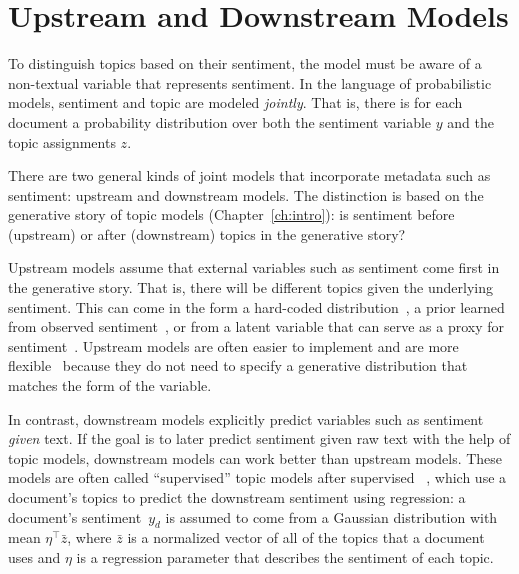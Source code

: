 
\section{Upstream and Downstream Models}

To distinguish topics based on their sentiment, the model must be
aware of a non-textual variable that represents sentiment.
In the language of probabilistic models,
sentiment and topic are modeled \emph{jointly}.  That is, there is for each document a
probability distribution over both the sentiment variable $y$ and
the topic assignments $z$.

There are two general kinds of joint models that incorporate metadata
such as sentiment: upstream and downstream models.  The distinction is
based on the generative story of topic models (Chapter~\ref{ch:intro}): is
sentiment before (upstream) or after (downstream) topics in the
generative story?


Upstream models assume that external variables such as sentiment come first in the generative
story.  That is, there will be different topics given the underlying
sentiment.  This can come in the form a hard-coded distribution~\citep{mei-07b}, a prior learned from observed
sentiment~\citep{mimno-08}, or from a latent variable that can serve as
a proxy for sentiment~\citep{lin-09}.  Upstream models are often
easier to implement and are more flexible~\citep{stewart-14} because they do not need to specify a generative distribution that matches the form of the variable.

In contrast, downstream models explicitly predict variables such as sentiment
\emph{given} text.  If the goal is to later predict sentiment given
raw text with the help of topic models, downstream models can work
better than upstream models.  These models are often called
``supervised'' topic models after supervised
~\citep[]{blei-07b}, which use a document's topics to predict
the downstream sentiment using regression: a document's sentiment~$y_d$ is
assumed to come from a Gaussian distribution with mean $\eta^\top \bar
z$, where $\bar z$ is a normalized vector of all of the topics that a
document uses and $\eta$ is a regression parameter that describes the
sentiment of each topic.

